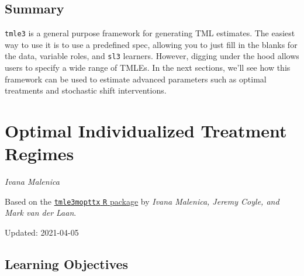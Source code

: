 \documentclass[12pt, krantz2,]{krantz}
\theoremstyle{definition}
\theoremstyle{definition}
\theoremstyle{definition}
\newcommand{\1}{\mathbbm{1}}
\begin{document}
\hypertarget{summary}{%
\subsection{Summary}\label{summary}}

\texttt{tmle3} is a general purpose framework for generating TML estimates. The easiest
way to use it is to use a predefined spec, allowing you to just fill in the
blanks for the data, variable roles, and \texttt{sl3} learners. However, digging under
the hood allows users to specify a wide range of TMLEs. In the next sections,
we'll see how this framework can be used to estimate advanced parameters such as
optimal treatments and stochastic shift interventions.

\hypertarget{optimal-individualized-treatment-regimes}{%
\section{Optimal Individualized Treatment Regimes}\label{optimal-individualized-treatment-regimes}}

\emph{Ivana Malenica}

Based on the \href{https://github.com/tlverse/tmle3mopttx}{\texttt{tmle3mopttx} \texttt{R} package}
by \emph{Ivana Malenica, Jeremy Coyle, and Mark van der Laan}.

Updated: 2021-04-05

\hypertarget{learning-objectives-4}{%
\subsection{Learning Objectives}\label{learning-objectives-4}}
\end{document}
